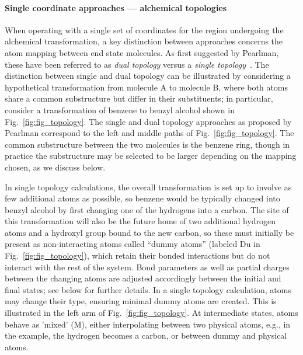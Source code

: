 \documentclass[9pt,bestpractices]{livecoms}
\begin{document}
\paragraph{Single coordinate approaches --- alchemical topologies}

When operating with a single set of coordinates for the region undergoing the alchemical transformation, a key distinction between approaches concerns the atom mapping between end state molecules. %
As first suggested by Pearlman, these have been referred to as \emph{dual topology} versus a \emph{single topology}~\cite{Pearlman_1994}. The distinction between single and dual topology can be illustrated by considering a hypothetical transformation from molecule A to molecule B, where both atoms share a common substructure but differ in their substituents; in particular, consider a transformation of benzene to benzyl alcohol shown in Fig.~\ref{fig:fig_topology}. The single and dual topology approaches as proposed by Pearlman correspond to the left and middle paths of Fig.~\ref{fig:fig_topology}.
The common substructure between the two molecules is the benzene ring, though in practice the substructure may be selected to be larger depending on the mapping chosen, as we discuss below.

In single topology calculations, the overall transformation is set up to involve as few additional atoms as possible, so benzene would be typically changed into benzyl alcohol by first changing one of the hydrogens into a carbon. The site of this transformation will also be the future home of two additional hydrogen atoms and a hydroxyl group bound to the new carbon, so these must initially be present as non-interacting atoms called ``dummy atoms'' (labeled Du in Fig.~\ref{fig:fig_topology}), which retain their bonded interactions but do not interact with the rest of the system.  Bond parameters as well as partial charges between the changing atoms are adjusted accordingly between the initial and final states; see below for further details. In a single topology calculation, atoms may change their type, ensuring minimal dummy atoms are created. This is illustrated in the left arm of Fig.~\ref{fig:fig_topology}. At intermediate states, atoms behave as 'mixed' (M), either interpolating between two physical atoms, e.g., in the example, the hydrogen becomes a carbon, or between dummy and physical atoms.
\end{document}
